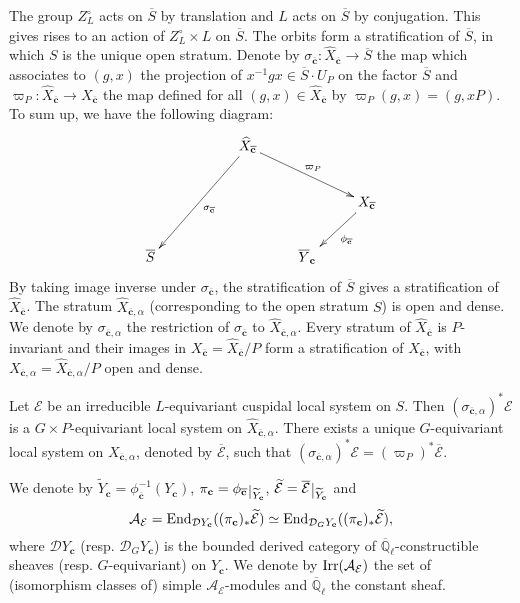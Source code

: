 \documentclass[11pt]{amsart}
\theoremstyle{definition}
\newcommand{\Q}{\mathbb Q}
\def\End{{\rm End}}
\def\Irr{{\rm Irr}}
\def\restriction#1#2{\mathchoice
              {\setbox1\hbox{${\displaystyle #1}_{\scriptstyle #2}$}
              \restrictionaux{#1}{#2}}
              {\setbox1\hbox{${\textstyle #1}_{\scriptstyle #2}$}
              \restrictionaux{#1}{#2}}
              {\setbox1\hbox{${\scriptstyle #1}_{\scriptscriptstyle #2}$}
              \restrictionaux{#1}{#2}}
              {\setbox1\hbox{${\scriptscriptstyle #1}_{\scriptscriptstyle #2}$}
              \restrictionaux{#1}{#2}}}
\def\restrictionaux#1#2{{#1\,\smash{\vrule height .8\ht1 depth .85\dp1}}_{\,#2}}
\begin{document}
The group $Z_L^{\circ}$ acts on $\overline{S}$ by translation and $L$ acts on 
$\overline{S}$ by conjugation. This gives rises to an action of $Z_L^{\circ}\times L$ 
on $\overline{S}$. The orbits form a stratification of $\overline{S}$, in which $S$ 
is the unique open stratum. Denote by $\sigma_{\overline{\mathbf{c}}} : 
\widehat{X}_{\overline{\mathbf{c}}} \longrightarrow \overline{S}$ the map which 
associates to $(g,x)$ the projection of $x^{-1}gx \in \overline{S} \cdot U_P$ 
on the factor $\overline{S}$ and $\varpi_{P} : \widehat{X}_{\overline{\mathbf{c}}} 
\longrightarrow X_{\overline{\mathbf{c}}}$ the map defined for all 
$(g,x) \in \widehat{X}_{\overline{\mathbf{c}}}$ by $\varpi_{P}(g,x)=(g,xP)$. 
To sum up, we have the following diagram: 
\[
\xymatrix{
 & & \ar[lldd]^{\sigma_{\overline{\mathbf{c}}}} \widehat{X}_{\overline{\mathbf{c}}} 
 \ar[rrd]^{\varpi_P}& & \\
 & &  & & X_{\overline{\mathbf{c}}} \ar[ld]^{\phi_{\overline{\mathbf{c}}}} \\
\overline{S}& &  & \overline{Y}_{\mathbf{c}}
}
\]
By taking image inverse under $\sigma_{\overline{\mathbf{c}}}$, the stratification of 
$\overline{S}$ gives a stratification of $\widehat{X}_{\overline{\mathbf{c}}}$. 
The stratum $\widehat{X}_{\overline{\mathbf{c}},\alpha}$ (corresponding to the open 
stratum $S$) is open and dense. We denote by $\sigma_{\overline{\mathbf{c}},\alpha}$ 
the restriction of $\sigma_{\overline{\mathbf{c}}}$ to 
$\widehat{X}_{\overline{\mathbf{c}},\alpha}$. Every stratum of 
$\widehat{X}_{\overline{\mathbf{c}}}$ is $P$-invariant and their images in 
$X_{\overline{\mathbf{c}}}=\widehat{X}_{\overline{\mathbf{c}}}/P$ form a stratification 
of $X_{\overline{\mathbf{c}}}$, with $X_{\overline{\mathbf{c}},\alpha}=
\widehat{X}_{\overline{\mathbf{c}},\alpha}/P$ open and dense.

Let $\mathcal{E}$ be an irreducible $L$-equivariant cuspidal local system on $S$. Then 
$(\sigma_{\overline{\mathbf{c}},\alpha})^{*}\mathcal{E}$ is a $G\times P$-equivariant 
local system on $\widehat{X}_{\overline{\mathbf{c}},\alpha}$. There exists a 
unique $G$-equivariant local system on $X_{\overline{\mathbf{c}},\alpha}$, denoted by 
$\overline{\mathcal{E}}$, such that $(\sigma_{\overline{\mathbf{c}},\alpha})^{*} 
\mathcal{E}=(\varpi_{P})^{*} \overline{\mathcal{E}}$.

We denote by $\widetilde{Y}_{\mathbf{c}}=\phi_{\overline{\mathbf{c}}}^{-1}(Y_{\mathbf{c}})$, 
$\pi_{\mathbf{c}}=\restriction{\phi_{\overline{\mathbf{c}}}}{\widetilde{Y}_{\mathbf{c}}}$, 
$\widetilde{\mathcal{E}}=\restriction{\overline{\mathcal{E}}}{\widetilde{Y}_{\mathbf{c}}}$ 
and $$\mathcal{A}_{\mathcal{E}}=\End_{\mathcal{D} 
Y_{\mathbf{c}}}((\pi_{\mathbf{c}})_{*}\widetilde{\mathcal{E}}) \simeq \End_{\mathcal{D}_{G} 
Y_{\mathbf{c}}}((\pi_{\mathbf{c}})_{*}\widetilde{\mathcal{E}}), $$ where 
$\mathcal{D} Y_{\mathbf{c}}$ (resp. $\mathcal{D}_{G} Y_{\mathbf{c}}$) 
is the bounded derived category of $\overline{\Q}_{\ell}$-constructible sheaves 
(resp. $G$-equivariant) on $Y_{\mathbf{c}}$. We denote by $\Irr(\mathcal{A}_{\mathcal{E}})$ 
the set of (isomorphism classes of)  simple $\mathcal{A}_{\mathcal{E}}$-modules and 
$\overline{\Q}_{\ell}$ the constant sheaf.
\end{document}
